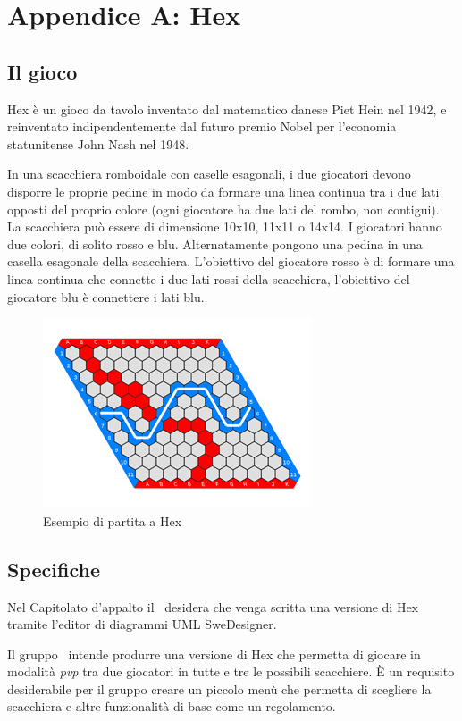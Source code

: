 \documentclass[../AnalisiDeiRequisiti.tex]{subfiles}
\begin{document}
	\section{Appendice A: Hex}

	\subsection{Il gioco}
		Hex è un gioco da tavolo inventato dal matematico danese Piet Hein nel 1942, e reinventato indipendentemente dal futuro premio Nobel per l'economia statunitense John Nash nel 1948.
		
		In una scacchiera romboidale con caselle esagonali, i due giocatori devono disporre le proprie pedine in modo da formare una linea continua tra i due lati opposti del proprio colore (ogni giocatore ha due lati del rombo, non contigui).
		La scacchiera può essere di dimensione 10x10, 11x11 o 14x14.
		I giocatori hanno due colori, di solito rosso e blu. Alternatamente pongono una pedina in una casella esagonale della scacchiera. L'obiettivo del giocatore rosso è di formare una linea continua che connette i due lati rossi della scacchiera, l'obiettivo del giocatore blu è connettere i lati blu.
		
		\begin{figure}
			\centering
			\includegraphics{./Figures/HexBoard.jpg}
			\caption{Esempio di partita a Hex}\label{fig:1}
		\end{figure}
	
	\subsection{Specifiche}
		Nel Capitolato d'appalto il \proponente\ desidera che venga scritta una versione di Hex tramite l'editor di diagrammi UML SweDesigner.
		
		Il gruppo \kaleidoscode\ intende produrre una versione di Hex che permetta di giocare in modalità \textit{pvp} tra due giocatori in tutte e tre le possibili scacchiere.
		È un requisito desiderabile per il gruppo creare un piccolo menù che permetta di scegliere la scacchiera e altre funzionalità di base come un regolamento.
		
		
	
	
\end{document}
